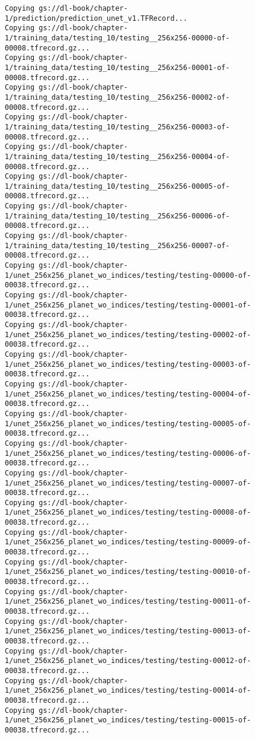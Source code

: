 \documentclass[
  letterpaper,
  DIV=11,
  numbers=noendperiod]{scrreprt}
\begin{document}
\begin{verbatim}
Copying gs://dl-book/chapter-1/prediction/prediction_unet_v1.TFRecord...
Copying gs://dl-book/chapter-1/training_data/testing_10/testing__256x256-00000-of-00008.tfrecord.gz...
Copying gs://dl-book/chapter-1/training_data/testing_10/testing__256x256-00001-of-00008.tfrecord.gz...
Copying gs://dl-book/chapter-1/training_data/testing_10/testing__256x256-00002-of-00008.tfrecord.gz...
Copying gs://dl-book/chapter-1/training_data/testing_10/testing__256x256-00003-of-00008.tfrecord.gz...
Copying gs://dl-book/chapter-1/training_data/testing_10/testing__256x256-00004-of-00008.tfrecord.gz...
Copying gs://dl-book/chapter-1/training_data/testing_10/testing__256x256-00005-of-00008.tfrecord.gz...
Copying gs://dl-book/chapter-1/training_data/testing_10/testing__256x256-00006-of-00008.tfrecord.gz...
Copying gs://dl-book/chapter-1/training_data/testing_10/testing__256x256-00007-of-00008.tfrecord.gz...
Copying gs://dl-book/chapter-1/unet_256x256_planet_wo_indices/testing/testing-00000-of-00038.tfrecord.gz...
Copying gs://dl-book/chapter-1/unet_256x256_planet_wo_indices/testing/testing-00001-of-00038.tfrecord.gz...
Copying gs://dl-book/chapter-1/unet_256x256_planet_wo_indices/testing/testing-00002-of-00038.tfrecord.gz...
Copying gs://dl-book/chapter-1/unet_256x256_planet_wo_indices/testing/testing-00003-of-00038.tfrecord.gz...
Copying gs://dl-book/chapter-1/unet_256x256_planet_wo_indices/testing/testing-00004-of-00038.tfrecord.gz...
Copying gs://dl-book/chapter-1/unet_256x256_planet_wo_indices/testing/testing-00005-of-00038.tfrecord.gz...
Copying gs://dl-book/chapter-1/unet_256x256_planet_wo_indices/testing/testing-00006-of-00038.tfrecord.gz...
Copying gs://dl-book/chapter-1/unet_256x256_planet_wo_indices/testing/testing-00007-of-00038.tfrecord.gz...
Copying gs://dl-book/chapter-1/unet_256x256_planet_wo_indices/testing/testing-00008-of-00038.tfrecord.gz...
Copying gs://dl-book/chapter-1/unet_256x256_planet_wo_indices/testing/testing-00009-of-00038.tfrecord.gz...
Copying gs://dl-book/chapter-1/unet_256x256_planet_wo_indices/testing/testing-00010-of-00038.tfrecord.gz...
Copying gs://dl-book/chapter-1/unet_256x256_planet_wo_indices/testing/testing-00011-of-00038.tfrecord.gz...
Copying gs://dl-book/chapter-1/unet_256x256_planet_wo_indices/testing/testing-00013-of-00038.tfrecord.gz...
Copying gs://dl-book/chapter-1/unet_256x256_planet_wo_indices/testing/testing-00012-of-00038.tfrecord.gz...
Copying gs://dl-book/chapter-1/unet_256x256_planet_wo_indices/testing/testing-00014-of-00038.tfrecord.gz...
Copying gs://dl-book/chapter-1/unet_256x256_planet_wo_indices/testing/testing-00015-of-00038.tfrecord.gz...

\end{verbatim}
\end{document}

